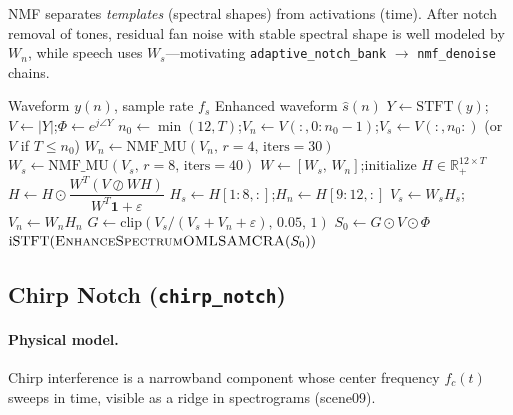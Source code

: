 \begin{remark}
NMF separates \emph{templates} (spectral shapes) from activations (time). After notch removal of tones, residual fan noise with stable spectral shape is well modeled by $W_n$, while speech uses $W_s$---motivating \texttt{adaptive\_notch\_bank} $\rightarrow$ \texttt{nmf\_denoise} chains.
\end{remark}

\begin{algorithm}[H]
  \caption{Semi-supervised NMF + OM-LSA (\texttt{nmf\_denoise})}
  \label{alg:nmf}
  \begin{algorithmic}[1]
    \Require Waveform $y(n)$, sample rate $f_s$
    \Ensure Enhanced waveform $\hat{s}(n)$
    \State $Y \gets \mathrm{STFT}(y)$;\quad $V \gets |Y|$;\quad $\Phi \gets e^{j\angle Y}$
    \State $n_0 \gets \min(12,T)$;\quad $V_n \gets V(:,0:n_0-1)$;\quad $V_s \gets V(:,n_0:)$ (or $V$ if $T\le n_0$)
    \State $W_n \gets \mathrm{NMF\_MU}(V_n,\, r=4,\, \mathrm{iters}=30)$
    \State $W_s \gets \mathrm{NMF\_MU}(V_s,\, r=8,\, \mathrm{iters}=40)$
    \State $W \gets [W_s,\, W_n]$;\quad initialize $H\in\mathbb{R}^{12\times T}_+$
     
      \State $H \gets H \odot \dfrac{W^T(V \oslash WH)}{W^T\mathbf{1}+\varepsilon}$ \Comment{\eqref{eq:nmf_mu}}
    \EndFor
    \State $H_s \gets H[1:8,:]$;\quad $H_n \gets H[9:12,:]$
    \State $V_s \gets W_s H_s$;\quad $V_n \gets W_n H_n$
    \State $G \gets \mathrm{clip}(V_s/(V_s+V_n+\varepsilon),\, 0.05,\, 1)$
    \State $S_0 \gets G \odot V \odot \Phi$
    \State \Return $\mathrm{iSTFT}(\textsc{EnhanceSpectrumOMLSAMCRA}(S_0))$
  \end{algorithmic}
\end{algorithm}

\subsection{Chirp Notch (\texttt{chirp\_notch})}

\paragraph{Physical model.}
Chirp interference is a narrowband component whose center frequency $f_c(t)$ sweeps in time, visible as a ridge in spectrograms (scene09).

